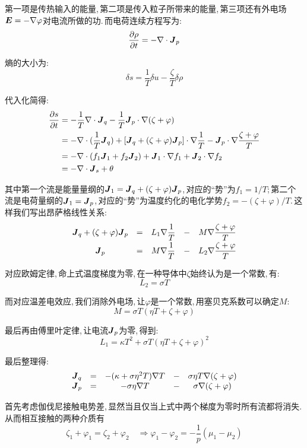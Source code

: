 第一项是传热输入的能量,\,第二项是传入粒子所带来的能量,\,第三项还有外电场\(\boldsymbol{E}=-\nabla\varphi\)对电流所做的功.\,而电荷连续方程写为:
\[\frac{\partial \rho}{\partial t}=-\nabla\cdot\boldsymbol{J}_p\]

熵的大小为:
\[\delta s=\frac{1}{T}\delta u-\frac{\zeta}{T}\delta \rho\]

代入化简得:
\begin{align*}
\frac{\partial s}{\partial t}	&=-\frac{1}{T}\nabla\cdot \boldsymbol{J}_q-\frac{1}{T}\boldsymbol{J}_p\cdot\nabla(\zeta+\varphi) \\
								&=-\nabla\cdot(\frac{1}{T}\boldsymbol{J}_q)+[\boldsymbol{J}_q+(\zeta+\varphi)\boldsymbol{J}_p]\cdot\nabla\frac{1}{T}-\boldsymbol{J}_p\cdot\nabla\frac{\zeta+\varphi}{T} \\
								&=-\nabla\cdot(f_1\boldsymbol{J}_1+f_2\boldsymbol{J}_2)+\boldsymbol{J}_1\cdot\nabla f_1+\boldsymbol{J}_2\cdot\nabla f_2 \\
								&=-\nabla\cdot\boldsymbol{J}_s+\theta
\end{align*}

其中第一个流是能量量纲的\(\boldsymbol{J}_1=\boldsymbol{J}_q+(\zeta+\varphi)\boldsymbol{J}_p\),\,对应的``势''为\(f_1=1/T\);\,第二个流是电荷量纲的\(\boldsymbol{J}_1=\boldsymbol{J}_p\),\,对应的``势''为温度约化的电化学势\(f_2=-(\zeta+\varphi)/T\).\,这样我们写出昂萨格线性关系:
\[\begin{matrix}
\boldsymbol{J}_q+(\zeta+\varphi)\boldsymbol{J}_p & = & L_1\nabla\dfrac{1}{T} & - & M\nabla\dfrac{\zeta+\varphi}{T} \\[5pt]
\boldsymbol{J}_p & = & M\nabla\dfrac{1}{T} & - & L_2\nabla\dfrac{\zeta+\varphi}{T}
\end{matrix}\]

对应欧姆定律,\,命上式温度梯度为零,\,在一种导体中\(\zeta\)始终认为是一个常数,\,有:
\[L_2=\sigma T\]

而对应温差电效应,\,我们消除外电场,\,让\(\varphi\)是一个常数,\,用塞贝克系数可以确定\(M\):
\[M=\sigma T(\eta T+\zeta+\varphi)\]

最后再由傅里叶定律,\,让电流\(\boldsymbol{J}_p\)为零,\,得到:
\[L_1=\kappa T^2+\sigma T(\eta T+\zeta+\varphi)^2\]

最后整理得:
\[\begin{matrix}
\boldsymbol{J}_q & = & -(\kappa +\sigma\eta^2 T)\nabla T & - & \sigma\eta T\nabla(\zeta+\varphi) \\
\boldsymbol{J}_p & = & -\sigma\eta\nabla T & - & \sigma\nabla(\zeta+\varphi)
\end{matrix}\]

首先考虑伽伐尼接触电势差,\,显然当且仅当上式中两个梯度为零时所有流都将消失.\,从而相互接触的两种介质有
\[\zeta_1+\varphi_1=\zeta_2+\varphi_2\quad\Longrightarrow \varphi_1-\varphi_2=-\frac{1}{p}(\mu_1-\mu_2)\]

